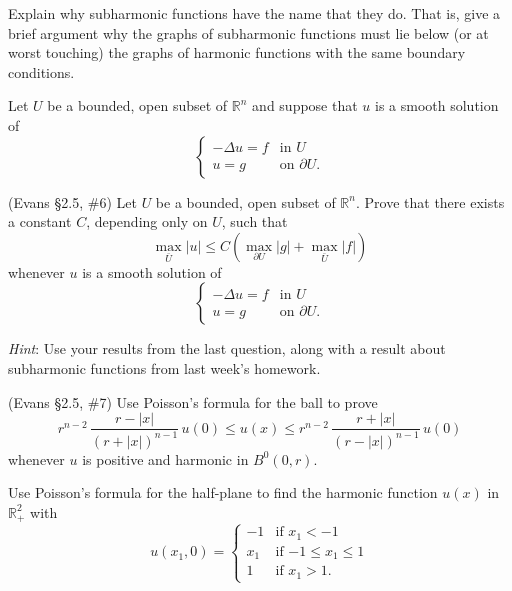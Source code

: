 \documentclass[12pt,fleqn]{exam}
\newcommand{\R}{\ensuremath{\mathbb{R}}}
\begin{document}
\begin{questions}

\question Explain why subharmonic functions have the name that they do. That is, give a brief argument why the graphs of subharmonic functions must lie below (or at worst touching) the graphs of harmonic functions with the same boundary conditions.

\question Let $U$ be a bounded, open subset of $\R^n$ and suppose that $u$ is a smooth solution of
\[\begin{cases}
-\Delta u = f & \text{in } U \\
u = g & \text{on } \partial U .
\end{cases}\]


\question (Evans \S2.5, \#6) Let $U$ be a bounded, open subset of $\R^n$. Prove that there exists a constant $C$, depending only on $U$, such that
\[\max_{\bar{U}} |u| \leq C(\max_{\partial U} |g| + \max_{\bar{U}} |f|)\]
whenever $u$ is a smooth solution of
\[\begin{cases}
-\Delta u = f & \text{in } U \\
u = g & \text{on } \partial U .
\end{cases}\]

\emph{Hint}: Use your results from the last question, along with a result about subharmonic functions from last week's homework.

\question (Evans \S2.5, \#7) Use Poisson's formula for the ball to prove
\[r^{n-2}\,\frac{r-|x|}{(r+|x|)^{n-1}}\,u(0) \leq u(x) \leq r^{n-2}\,\frac{r+|x|}{(r-|x|)^{n-1}}\,u(0)\]
whenever $u$ is positive and harmonic in $B^0(0,r)$.

\question Use Poisson's formula for the half-plane to find the harmonic function $u(x)$ in $\R^2_+$ with
\[u(x_1,0) = \begin{cases} -1 & \text{if $x_1 < -1$} \\ x_1 & \text{if $-1 \leq x_1 \leq 1$} \\ 1 & \text{if $x_1 > 1$}.\end{cases}\]

\end{questions}
\end{document}

